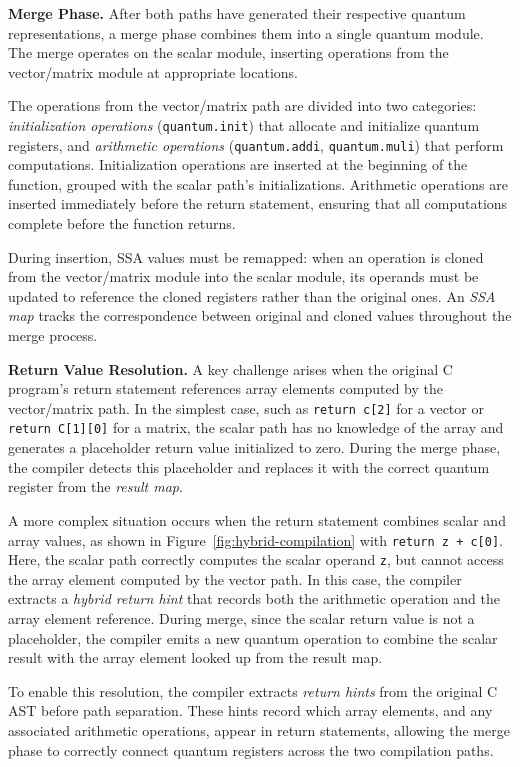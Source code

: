 \textbf{Merge Phase.} After both paths have generated their respective quantum representations, a merge phase combines them into a single quantum module. The merge operates on the scalar module, inserting operations from the vector/matrix module at appropriate locations.

The operations from the vector/matrix path are divided into two categories: \emph{initialization operations} (\texttt{quantum.init}) that allocate and initialize quantum registers, and \emph{arithmetic operations} (\texttt{quantum.addi}, \texttt{quantum.muli}) that perform computations. Initialization operations are inserted at the beginning of the function, grouped with the scalar path's initializations. Arithmetic operations are inserted immediately before the return statement, ensuring that all computations complete before the function returns.

During insertion, SSA values must be remapped: when an operation is cloned from the vector/matrix module into the scalar module, its operands must be updated to reference the cloned registers rather than the original ones. An \emph{SSA map} tracks the correspondence between original and cloned values throughout the merge process.

\textbf{Return Value Resolution.} A key challenge arises when the original C program's return statement references array elements computed by the vector/matrix path. In the simplest case, such as \texttt{return c[2]} for a vector or \texttt{return C[1][0]} for a matrix, the scalar path has no knowledge of the array and generates a placeholder return value initialized to zero. During the merge phase, the compiler detects this placeholder and replaces it with the correct quantum register from the \emph{result map}.

A more complex situation occurs when the return statement combines scalar and array values, as shown in Figure~\ref{fig:hybrid-compilation} with \texttt{return z + c[0]}. Here, the scalar path correctly computes the scalar operand \texttt{z}, but cannot access the array element computed by the vector path. In this case, the compiler extracts a \emph{hybrid return hint} that records both the arithmetic operation and the array element reference. During merge, since the scalar return value is not a placeholder, the compiler emits a new quantum operation to combine the scalar result with the array element looked up from the result map.

To enable this resolution, the compiler extracts \emph{return hints} from the original C AST before path separation. These hints record which array elements, and any associated arithmetic operations, appear in return statements, allowing the merge phase to correctly connect quantum registers across the two compilation paths.


